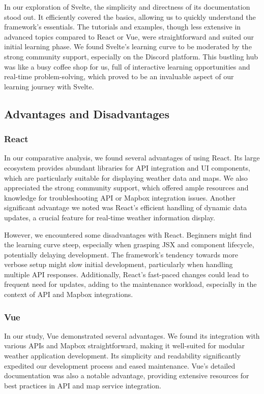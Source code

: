 In our exploration of Svelte, the simplicity and directness of its documentation stood out. It efficiently covered the basics, allowing us to quickly understand the framework's essentials. The tutorials and examples, though less extensive in advanced topics compared to React or Vue, were straightforward and suited our initial learning phase. We found Svelte's learning curve to be moderated by the strong community support, especially on the Discord platform. This bustling hub was like a busy coffee shop for us, full of interactive learning opportunities and real-time problem-solving, which proved to be an invaluable aspect of our learning journey with Svelte.

\subsection{Advantages and Disadvantages}

\subsubsection{React}

In our comparative analysis, we found several advantages of using React. Its large ecosystem provides abundant libraries for API integration and UI components, which are particularly suitable for displaying weather data and maps. We also appreciated the strong community support, which offered ample resources and knowledge for troubleshooting API or Mapbox integration issues. Another significant advantage we noted was React's efficient handling of dynamic data updates, a crucial feature for real-time weather information display.

However, we encountered some disadvantages with React. Beginners might find the learning curve steep, especially when grasping JSX and component lifecycle, potentially delaying development. The framework's tendency towards more verbose setup might slow initial development, particularly when handling multiple API responses. Additionally, React's fast-paced changes could lead to frequent need for updates, adding to the maintenance workload, especially in the context of API and Mapbox integrations.

\subsubsection{Vue}

In our study, Vue demonstrated several advantages. We found its integration with various APIs and Mapbox straightforward, making it well-suited for modular weather application development. Its simplicity and readability significantly expedited our development process and eased maintenance. Vue's detailed documentation was also a notable advantage, providing extensive resources for best practices in API and map service integration.

